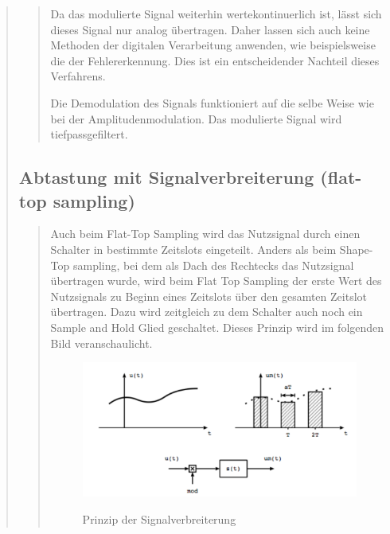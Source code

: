 \begin{quote}
\begin{quote}
        Da das modulierte Signal weiterhin wertekontinuerlich ist, lässt sich
        dieses Signal nur analog übertragen. Daher lassen sich auch keine Methoden der digitalen Verarbeitung anwenden, 
        wie beispielsweise die der Fehlererkennung. Dies ist ein entscheidender
        Nachteil dieses Verfahrens.\vspace{1em}
        
        Die Demodulation des Signals funktioniert auf die selbe Weise wie bei der Amplitudenmodulation. Das
        modulierte Signal wird tiefpassgefiltert. 
        
    \end{quote}%
    
    \subsection{Abtastung mit Signalverbreiterung (flat-top sampling)}
    \begin{quote}
        Auch beim Flat-Top Sampling wird das Nutzsignal durch einen Schalter in bestimmte Zeitslots eingeteilt. Anders
        als beim Shape-Top sampling, bei dem als Dach des Rechtecks das Nutzsignal übertragen wurde, wird beim Flat Top
        Sampling der erste Wert des Nutzsignals zu Beginn eines Zeitslots über den gesamten Zeitslot übertragen. 
        Dazu wird zeitgleich zu dem Schalter auch noch ein Sample and Hold Glied
        geschaltet. Dieses Prinzip wird im folgenden Bild veranschaulicht.
        
        \begin{figure}[H]
        \centering
            \includegraphics[scale=0.7, trim = 0cm 0cm 0cm 0cm, clip]{./Bilder/PrinzipSignalverbreiterung}
                \caption{Prinzip der Signalverbreiterung}
                \cite{AmplitudenspektrumShap_Top}
        \end{figure}
        

\end{quote}
\end{quote}
